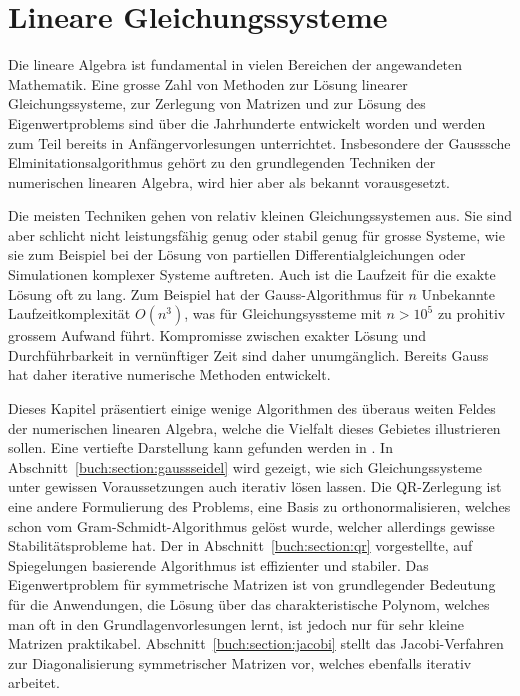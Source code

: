 %
%
%
\chapter{Lineare Gleichungssysteme\label{chapter:linsys}}
\rhead{}
Die lineare Algebra ist fundamental in vielen Bereichen der angewandeten
Mathematik.
Eine grosse Zahl von Methoden zur Lösung linearer
Gleichungssysteme, zur Zerlegung von Matrizen und zur Lösung des
Eigenwertproblems sind über die Jahrhunderte entwickelt worden und
werden zum Teil bereits in Anfängervorlesungen unterrichtet.
Insbesondere der Gausssche Elminitationsalgorithmus gehört zu den
grundlegenden Techniken der numerischen linearen Algebra, wird hier
aber als bekannt vorausgesetzt.

Die meisten Techniken gehen von relativ kleinen Gleichungssystemen aus.
Sie sind aber schlicht nicht leistungsfähig genug oder stabil genug für 
grosse Systeme, wie sie zum Beispiel bei der Lösung von partiellen
Differentialgleichungen oder Simulationen komplexer Systeme auftreten.
Auch ist die Laufzeit für die exakte Lösung oft zu lang.
Zum Beispiel hat der Gauss-Algorithmus für $n$ Unbekannte Laufzeitkomplexität
$O(n^3)$, was für Gleichungsyssteme mit $n>10^5$ zu prohitiv grossem
Aufwand führt.
Kompromisse zwischen exakter Lösung und Durchführbarkeit in vernünftiger
Zeit sind daher unumgänglich.
Bereits Gauss hat daher iterative numerische Methoden entwickelt.

Dieses Kapitel präsentiert einige wenige Algorithmen des überaus weiten
Feldes der numerischen linearen Algebra, welche die Vielfalt dieses
Gebietes illustrieren sollen.
Eine vertiefte Darstellung kann gefunden werden in \cite{buch:watkins}.
In Abschnitt~\ref{buch:section:gaussseidel} wird gezeigt, wie sich
Gleichungssysteme unter gewissen Voraussetzungen auch iterativ lösen
lassen.
Die QR-Zerlegung ist eine andere Formulierung des Problems, eine Basis
zu orthonormalisieren, welches schon vom Gram-Schmidt-Algorithmus gelöst
wurde, welcher allerdings gewisse Stabilitätsprobleme hat.
Der in Abschnitt~\ref{buch:section:qr} vorgestellte, auf Spiegelungen
basierende Algorithmus ist effizienter und stabiler.
Das Eigenwertproblem für symmetrische Matrizen ist von grundlegender
Bedeutung für die Anwendungen, die Lösung über das charakteristische 
Polynom, welches man oft in den Grundlagenvorlesungen lernt, ist jedoch
nur für sehr kleine Matrizen praktikabel.
Abschnitt~\ref{buch:section:jacobi} stellt das Jacobi-Verfahren zur
Diagonalisierung symmetrischer Matrizen vor, welches ebenfalls iterativ
arbeitet.

